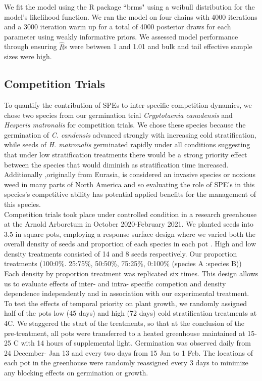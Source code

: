 \documentclass{article}\usepackage[]{graphicx}\usepackage[]{color}
\begin{document}
\noindent We fit the model using the R package ``brms" \citep{Burkner2018} using a weibull distribution for the model's likelihood function. We ran the model on four chains with 4000 iterations and a 3000 iteration warm up for a total of 4000 posterior draws for each parameter using weakly informative priors. We assessed  model performance through ensuring $\hat{R}$s were between 1 and 1.01 and bulk and tail effective sample sizes were high.

\subsection{Competition Trials}
To quantify the contribution of SPEs to inter-specific competition dynamics, we chose two species from our germination trial \textit{Cryptotaenia canadensis} and \textit{Hesperis matronalis} for competition trials. We chose these species because the germination of \textit{C. candensis} advanced strongly with increasing cold stratification, while seeds of \textit{H. matronalis} germinated rapidly under all conditions suggesting that under low stratification treatments there would be a strong priority effect between the species that would diminish as stratification time increased. Additionally ,originally from Eurasia, is considered an invasive species or noxious weed in many parts of North America and so evaluating the role of SPE's in this species's competitive ability has potential applied benefits for the management of this species.\\

\noindent Competition trials took place under controlled condition in a research greenhouse at the Arnold Arboretum in October 2020-February 2021. We planted seeds into 3.5 in square pots, employing a response surface design where we varied both the overall density of seeds and proportion of each species in each pot \citep{Inouye2001}. High and low density treatments consisted of 14 and 8 seeds respectively. Our proportion treatments (100:0\%. 25:75\%, 50:50\%, 75:25\%, 0:100\% (species A :species B)) Each density by proportion treatment was replicated six times. This design allows us to evaluate effects of inter- and intra- specific competion and density dependence independently and in association with our experimental treatment.\\

\noindent To test the effects of temporal priority on plant growth, we randomly assigned half of the pots low (45 days) and high (72 days) cold stratification treatments at 4\degree C. We staggered the start of the treatments, so that at the conclusion of the pre-treatment, all pots were transferred to a heated greenhouse maintained at 15-25 \degree C with 14 hours of supplemental light. Germination was observed daily from 24 December- Jan 13 and every two days from 15 Jan to 1 Feb. The locations of each pot in the greenhouse were randomly reassigned every 3 days to minimize any blocking effects on germination or growth.
\end{document}
